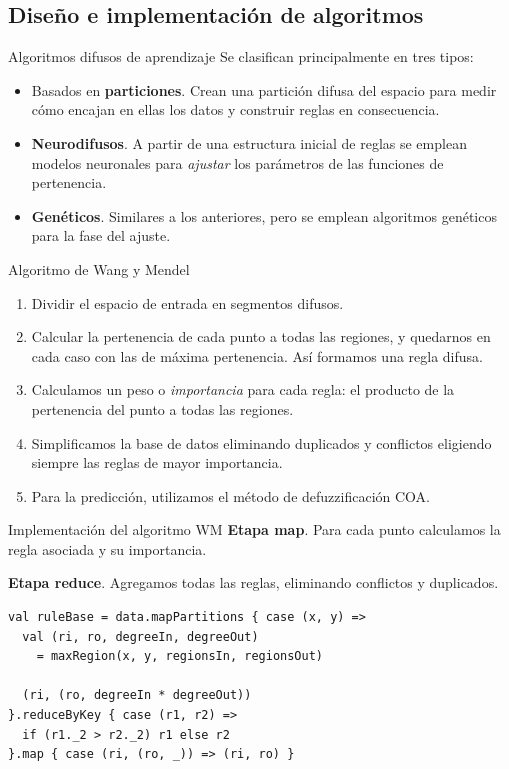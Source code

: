 \documentclass[spanish]{beamer}
\begin{document}
\subsection{Diseño e implementación de algoritmos}

\begin{frame}{Algoritmos difusos de aprendizaje}
  Se clasifican principalmente en tres tipos:

  \begin{itemize}
    \item Basados en \textbf{particiones}. Crean una partición difusa del espacio para medir cómo encajan en ellas los datos y construir reglas en consecuencia.
    \item \textbf{Neurodifusos}. A partir de una estructura inicial de reglas se emplean modelos neuronales para \textit{ajustar} los parámetros de las funciones de pertenencia.
    \item \textbf{Genéticos}. Similares a los anteriores, pero se emplean algoritmos genéticos para la fase del ajuste.
  \end{itemize}
\end{frame}

\begin{frame}{Algoritmo de Wang y Mendel}
  \begin{enumerate}[<+->]
    \item Dividir el espacio de entrada en segmentos difusos.
    \item Calcular la pertenencia de cada punto a todas las regiones, y quedarnos en cada caso con las de máxima pertenencia. Así formamos una regla difusa.
    \item Calculamos un peso o \textit{importancia} para cada regla: el producto de la pertenencia del punto a todas las regiones.
    \item Simplificamos la base de datos eliminando duplicados y conflictos eligiendo siempre las reglas de mayor importancia.
    \item Para la predicción, utilizamos el método de defuzzificación COA.
  \end{enumerate}
\end{frame}



\begin{frame}[fragile]{Implementación del algoritmo WM}
  \textbf{Etapa map}. Para cada punto calculamos la regla asociada y su importancia.

  \textbf{Etapa reduce}. Agregamos todas las reglas, eliminando conflictos y duplicados.

  \pause
  \begin{lstlisting}
val ruleBase = data.mapPartitions { case (x, y) =>
  val (ri, ro, degreeIn, degreeOut)
    = maxRegion(x, y, regionsIn, regionsOut)

  (ri, (ro, degreeIn * degreeOut))
}.reduceByKey { case (r1, r2) =>
  if (r1._2 > r2._2) r1 else r2
}.map { case (ri, (ro, _)) => (ri, ro) }
  \end{lstlisting}
\end{frame}
\end{document}
